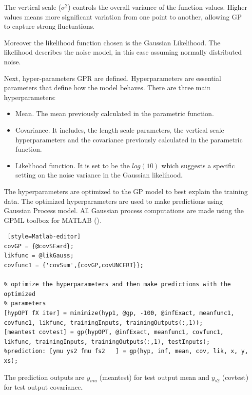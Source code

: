 The vertical scale ($\sigma^2$) controls the overall variance of the function values. Higher values means more significant variation from one point to another, allowing GP to capture strong fluctuations. 

Moreover the likelihood function chosen is the Gaussian Likelihood. The likelihood describes the noise model, in this case assuming normally distributed noise. 

Next, hyper-parameters GPR are defined. Hyperparameters are essential parameters that define how the model behaves. There are three main hyperparameters:

\begin{itemize}

    \item Mean. The mean previously calculated in the parametric function.
    \item Covariance. It includes, the length scale parameters, the vertical scale hyperparameters and the covariance previously calculated in the parametric function. 

    \item Likelihood function. It is set to be the $log(10)$ which suggests a specific setting on the noise variance in the Gaussian likelihood. 

\end{itemize}

The hyperparameters are optimized to the GP model to best explain the training data. The optimized hyperparameters are used to make predictions using Gaussian Process model. All Gaussian process computations are made using the GPML toolbox for MATLAB (\cite{GPML}).

\begin{lstlisting} [style=Matlab-editor]
covGP = {@covSEard};
likfunc = @likGauss;
covfunc1 = {'covSum',{covGP,covUNCERT}};

% optimize the hyperparameters and then make predictions with the optimized
% parameters
[hypOPT fX iter] = minimize(hyp1, @gp, -100, @infExact, meanfunc1, covfunc1, likfunc, trainingInputs, trainingOutputs(:,1));
[meantest covtest] = gp(hypOPT, @infExact, meanfunc1, covfunc1, likfunc, trainingInputs, trainingOutputs(:,1), testInputs);
%prediction: [ymu ys2 fmu fs2   ] = gp(hyp, inf, mean, cov, lik, x, y, xs);
\end{lstlisting}

The prediction outputs are $y_{mu}$ (meantest) for test output mean and $y_{s2}$ (covtest) for test output covariance. 

